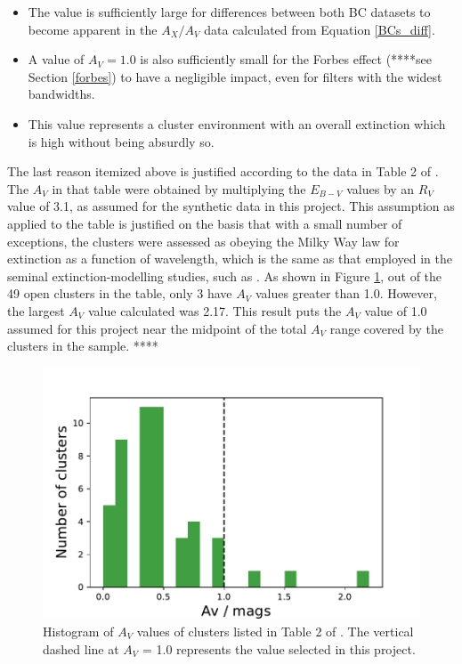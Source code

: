 \documentclass[12pt, a4paper]{report}
\begin{document}
\begin{itemize}
\item The value is sufficiently large for differences between both BC datasets to become apparent in the $A_{X}/A_{V}$ data calculated from Equation \ref{BCs_diff}.
\item A value of $A_{V} = 1.0$ is also sufficiently small for the Forbes effect  (****see Section \ref{forbes}) to have a negligible impact, even for filters with the widest bandwidths.
\item This value represents a cluster environment with an overall extinction which is high without being absurdly so.
\end{itemize}
The last reason itemized above is justified according to the data in Table 2 of \cite{2019AJ....158...35S}. The $A_{V}$ in that table were obtained by multiplying the $E_{B-V}$ values by an $R_{V}$ value of 3.1, as assumed for the synthetic data in this project. This assumption as applied to the table is justified on the basis that with a small number of exceptions, the clusters were assessed as obeying the Milky Way law for extinction as a function of wavelength, which is the same as that employed in the seminal extinction-modelling studies, such as \cite{1989ApJ...345..245C}. As shown in Figure \ref{siegel_Av_vals}, out of the 49 open clusters in the table, only 3 have $A_{V}$ values greater than 1.0. However, the largest $A_{V}$ value calculated was 2.17. This result puts the $A_{V}$ value of 1.0 assumed for this project near the midpoint of the total $A_{V}$ range covered by the clusters in the \cite{2019AJ....158...35S} sample. ****

\begin{figure}[h!]
\begin{center}
\includegraphics[width=1.0\textwidth]{../siegel_clusters_Av_vals_hist.pdf}
\caption{Histogram of $A_{V}$ values of clusters listed in Table 2 of \cite{2019AJ....158...35S}. The vertical dashed line at $A_{V}$ = 1.0 represents the value selected in this project.}
\label{siegel_Av_vals}
\end{center}
\end{figure}
\end{document}
